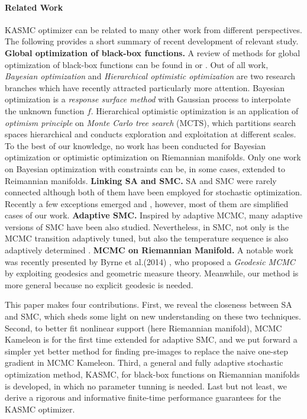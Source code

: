 \documentclass{article} %
\begin{document}
\paragraph{Related Work} \quad
KASMC optimizer can be related to many other work from different perspectives. The following provides a short summary of recent development of relevant study. 
\textbf{Global optimization of black-box functions.} A review of methods for global optimization of black-box functions  
can be found in 
\cite{black_box_optimization} or \cite{black_box_optimization_book}.   
Out of all work, \emph{Bayesian optimization} \cite{BO_tutorial,BO_NIPS} 
and \emph{Hierarchical optimistic optimization} \cite{optimistic}
are two research branches which have recently attracted particularly more attention.  
Bayesian optimization is a \emph{response surface method} with Gaussian process to interpolate  
the unknown function $f$. Hierarchical optimistic optimization is an application of \emph{optimism principle} on 
\emph{Monte Carlo tree search} (MCTS), which partitions search spaces hierarchical and conducts exploration and 
exploitation at different scales.
To the best of our knowledge, no work has been conducted for Bayesian optimization or optimistic optimization on Riemannian 
manifolds. Only one work on Bayesian optimization with constraints \cite{BO_constraint} can be, in some cases, extended to Reimannian manifolds.        
\textbf{Linking SA and SMC.} SA and SMC were rarely connected although both of them have been employed for stochastic optimization.  
Recently a few exceptions emerged \cite{SMCSA} and \cite{SABL}, however, most of them are simplified cases of our work. 
\textbf{Adaptive SMC.} Inspired by adaptive MCMC, many adaptive versions of SMC have been also studied. 
Nevertheless, in SMC, not only is the MCMC transition adaptively tuned, but 
also the temperature sequence is also adaptively determined \cite{SMC_ABC, ASMC_1, ASMC_binary,convergence_ASMC}. 
\textbf{MCMC on Riemannian Manifold. } A notable work was recently presented by Byrne et al.(2014) \cite{geodesic_MCMC}, who proposed a \emph{Geodesic MCMC}
by exploiting geodesics and geometric measure theory. Meanwhile, our method is more general because no explicit geodesic is needed.   

This paper makes four contributions.  First, we reveal the closeness between SA and SMC, which sheds some light on new understanding on these two techniques.
Second, to better fit nonlinear support (here Riemannian manifold), MCMC Kameleon is for the first time extended for adaptive SMC, and we put forward a simpler 
yet better method for finding pre-images to replace the naive one-step gradient in MCMC Kameleon.       
Third, a general and fully adaptive stochastic optimization method, KASMC, for black-box functions on Riemannian manifolds is developed, in which 
no parameter tunning is needed. 
Last but not least, we derive a rigorous and informative finite-time performance guarantees for the KASMC optimizer.   
\end{document}
